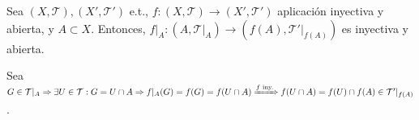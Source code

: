 \begin{ejr}[32]
  Sea $( X, \mathcal{T} ), ( X', \mathcal{T}' )$ e.t., $f : ( X, \mathcal{T} ) \to ( X', \mathcal{T}' )$ aplicación inyectiva y abierta, y $A \subset X$. Entonces, $f|_{A} : ( A, \mathcal{T}|_{A}) \to ( f(A), \mathcal{T}'|_{f(A)})$ es inyectiva y abierta.
\end{ejr}

\begin{sol}
  Sea $G \in \mathcal{T}|_{A} \Rightarrow \exists U \in \mathcal{T}: G = U \cap A \Rightarrow f|_{A}(G) = f(G) = f(U \cap A) \xRightarrow[]{ f \text{ iny.} } f(U \cap A ) = f(U) \cap f(A) \in \mathcal{T}'|_{f(A)}$.
\end{sol}
